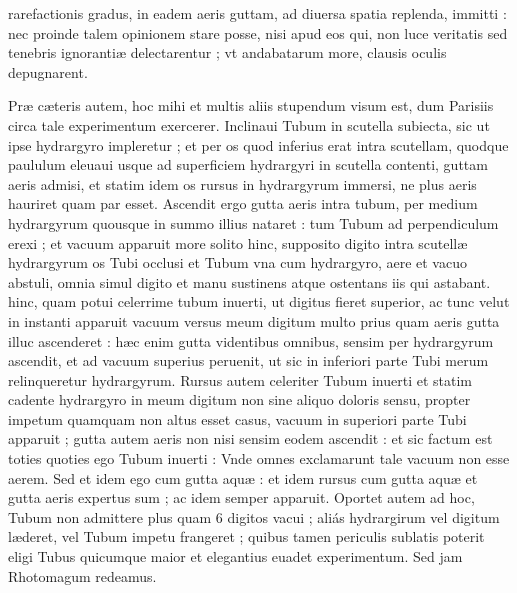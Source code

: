 \documentclass[11pt,a4paper]{article}
\begin{document}
rarefactionis gradus, in eadem aeris guttam, ad diuersa spatia  replenda, immitti : nec proinde talem opinionem stare posse, nisi apud eos qui, non luce veritatis sed tenebris ignorantiæ delectarentur ; vt andabatarum more, clausis oculis depugnarent.


Præ cæteris autem, hoc mihi et multis aliis stupendum visum est, dum Parisiis circa tale experimentum exercerer. Inclinaui Tubum in scutella subiecta, sic ut ipse hydrargyro impleretur ; et per os quod inferius erat intra scutellam, quodque paululum eleuaui usque ad superficiem hydrargyri in scutella contenti, guttam aeris admisi, et statim idem os rursus in hydrargyrum immersi, ne plus aeris hauriret quam par esset. Ascendit ergo gutta aeris intra tubum, per medium hydrargyrum quousque in summo illius nataret : tum Tubum ad perpendiculum erexi ; et vacuum apparuit more solito hinc, supposito digito intra scutellæ hydrargyrum os Tubi occlusi et Tubum vna cum hydrargyro, aere et vacuo abstuli, omnia simul digito et manu sustinens atque ostentans iis qui astabant. hinc, quam potui celerrime tubum inuerti, ut digitus fieret superior, ac tunc velut in instanti apparuit vacuum versus meum digitum multo prius quam aeris gutta illuc ascenderet : hæc enim gutta videntibus omnibus, sensim per hydrargyrum ascendit, et ad vacuum superius peruenit, ut sic in inferiori parte Tubi merum relinqueretur hydrargyrum. Rursus autem celeriter Tubum inuerti et statim cadente hydrargyro in meum digitum non sine aliquo doloris sensu, propter impetum quamquam non altus esset casus, vacuum in superiori parte Tubi apparuit ; gutta autem aeris non nisi sensim eodem ascendit : et sic factum est toties quoties ego Tubum inuerti : Vnde omnes exclamarunt tale vacuum non esse aerem. Sed et idem ego cum gutta aquæ : et idem rursus cum gutta aquæ et gutta aeris expertus sum ; ac idem semper apparuit. Oportet autem ad hoc, Tubum non admittere plus quam 6 digitos vacui ; aliás hydrargirum vel digitum læderet, vel Tubum impetu frangeret ; quibus tamen periculis sublatis poterit eligi Tubus quicumque maior et elegantius euadet experimentum. Sed jam Rhotomagum redeamus.
\end{document}
